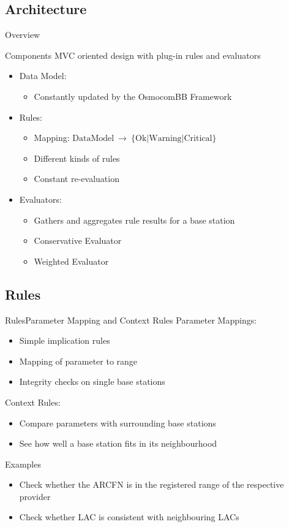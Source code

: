 \documentclass{beamer}
\begin{document}
\subsection{Architecture}
\begin{frame}{Overview}
\centering
\end{frame}

\begin{frame}{Components}
MVC oriented design with plug-in rules and evaluators
\begin{itemize}
	\item Data Model:
	\begin{itemize}
		\item Constantly updated by the OsmocomBB Framework
	\end{itemize}
	\item Rules:
	\begin{itemize}
		\item Mapping: $\text{DataModel}~\rightarrow~\{\text{Ok}\vert\text{Warning}\vert\text{Critical}\}$
		\item Different kinds of rules
		\item Constant re-evaluation
	\end{itemize}
	\item Evaluators:
	\begin{itemize}
		\item Gathers and aggregates rule results for a base station
		\item Conservative Evaluator
		\item Weighted Evaluator
	\end{itemize}
\end{itemize}
\end{frame}

\subsection{Rules}
\begin{frame}{Rules}{Parameter Mapping and Context Rules}
Parameter Mappings:
\begin{itemize}
	\item Simple implication rules
	\item Mapping of parameter to range
	\item Integrity checks on single base stations
\end{itemize}
Context Rules:
\begin{itemize}
	\item Compare parameters with surrounding base stations
	\item See how well a base station fits in its neighbourhood
\end{itemize}
\begin{exampleblock}{Examples}
\begin{itemize}
	\item Check whether the ARCFN is in the registered range of the respective provider
	\item Check whether LAC is consistent with neighbouring LACs
\end{itemize}
\end{exampleblock}
\end{frame}
\end{document}
